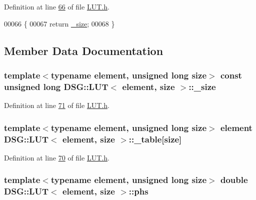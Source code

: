 Definition at line \hyperlink{_l_u_t_8h_source_l00066}{66} of file \hyperlink{_l_u_t_8h_source}{L\+U\+T.\+h}.


\begin{DoxyCode}
00066                                         \{
00067             \textcolor{keywordflow}{return} \hyperlink{class_d_s_g_1_1_l_u_t_a87c352b5eaea2188955213c0f4ae9799}{\_size};
00068         \}
\end{DoxyCode}


\subsection{Member Data Documentation}
\hypertarget{class_d_s_g_1_1_l_u_t_a87c352b5eaea2188955213c0f4ae9799}{
\subsubsection[{\+\_\+size}]{\setlength{\rightskip}{0pt plus 5cm}template$<$typename element, unsigned long size$>$ const unsigned long {\bf D\+S\+G\+::\+L\+U\+T}$<$ element, size $>$\+::\+\_\+size\hspace{0.3cm}{\ttfamily [protected]}}}\label{class_d_s_g_1_1_l_u_t_a87c352b5eaea2188955213c0f4ae9799}


Definition at line \hyperlink{_l_u_t_8h_source_l00071}{71} of file \hyperlink{_l_u_t_8h_source}{L\+U\+T.\+h}.

\hypertarget{class_d_s_g_1_1_l_u_t_ac8b23bbb7ce259d4ceb1c6fa93a7f29f}{
\subsubsection[{\+\_\+table}]{\setlength{\rightskip}{0pt plus 5cm}template$<$typename element, unsigned long size$>$ element {\bf D\+S\+G\+::\+L\+U\+T}$<$ element, size $>$\+::\+\_\+table\mbox{[}size\mbox{]}\hspace{0.3cm}{\ttfamily [protected]}}}\label{class_d_s_g_1_1_l_u_t_ac8b23bbb7ce259d4ceb1c6fa93a7f29f}


Definition at line \hyperlink{_l_u_t_8h_source_l00070}{70} of file \hyperlink{_l_u_t_8h_source}{L\+U\+T.\+h}.

\hypertarget{class_d_s_g_1_1_l_u_t_a9ab8f8e89346c759e06f6d76c5b816cc}{
\subsubsection[{phs}]{\setlength{\rightskip}{0pt plus 5cm}template$<$typename element, unsigned long size$>$ double {\bf D\+S\+G\+::\+L\+U\+T}$<$ element, size $>$\+::phs\hspace{0.3cm}{\ttfamily [protected]}}}\label{class_d_s_g_1_1_l_u_t_a9ab8f8e89346c759e06f6d76c5b816cc}


